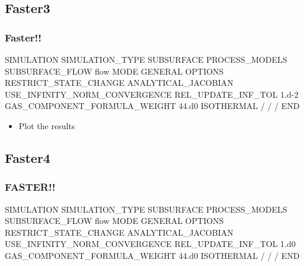 \documentclass{beamer}
\begin{document}
\subsection{Faster3}
\begin{frame}[fragile]\frametitle{Faster!!}

\begin{semiverbatim}
SIMULATION
  SIMULATION_TYPE SUBSURFACE
  PROCESS_MODELS
    SUBSURFACE_FLOW flow
      MODE GENERAL 
      OPTIONS
        RESTRICT_STATE_CHANGE
        ANALYTICAL_JACOBIAN
        USE_INFINITY_NORM_CONVERGENCE
        REL_UPDATE_INF_TOL 1.d-2
        GAS_COMPONENT_FORMULA_WEIGHT 44.d0  
        ISOTHERMAL 
      /
    /
  /
END
\end{semiverbatim}

\begin{itemize}
  \item Plot the results
\end{itemize}

\end{frame}
\subsection{Faster4}
\begin{frame}[fragile]\frametitle{FASTER!!}

\begin{semiverbatim}
SIMULATION
  SIMULATION_TYPE SUBSURFACE
  PROCESS_MODELS
    SUBSURFACE_FLOW flow
      MODE GENERAL 
      OPTIONS
        RESTRICT_STATE_CHANGE
        ANALYTICAL_JACOBIAN
        USE_INFINITY_NORM_CONVERGENCE
        REL_UPDATE_INF_TOL 1.d0
        GAS_COMPONENT_FORMULA_WEIGHT 44.d0  
        ISOTHERMAL 
      /
    /
  /
END
\end{semiverbatim}

\end{frame}

\end{document}
